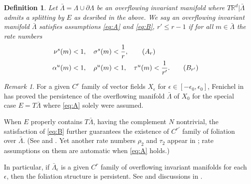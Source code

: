 \documentclass[usletter,11pt]{article}
\def\red{\color{red}}
\def\blue{\color{blue}}
\newtheorem{definition}{Definition}[section]
\theoremstyle{remark}
\newtheorem{remark}{Remark}[section]
\begin{document}
\begin{definition} \label{def:over}
Let $\bar{\Lambda}=\Lambda \cup \partial\Lambda$  be an overflowing invariant manifold {\blue where $T \mathbb{R}^d|\bar\Lambda$} admits a splitting by $E$ as desribed in the above. We say an overflowing invariant manifold $\bar{\Lambda}$ satisfies assumptions \eqref{eq:A} and \eqref{eq:B}, $r'\le r-1$ if for all $m\in \bar{\Lambda}$ the  rate numbers
\begin{align}
\nu^s(m)&<1, \quad \sigma^s(m)<\frac{1}{r}, \label{eq:A}\tag{$A_r$}   \\
\alpha^u(m)&<1, \quad \rho^u(m)<1, \quad \tau^u(m)<\frac{1}{r'}. \label{eq:B}\tag{$B_{r'}$}  
\end{align}
\end{definition}
\begin{remark}
For a given $C^r$ family of vector fields $X_\epsilon$ for $\epsilon\in[-\epsilon_0,\epsilon_0]$, Fenichel  in \cite{fenichel_persistence_1972} has proved the persistence of the overflowing manifold $\bar\Lambda$ of $X_0$ {\red for the special case $E=T\bar\Lambda$ where \eqref{eq:A} solely were assumed.}

{\blue When $E$ properly contains $T\bar\Lambda$, having the complement $N$ nontrivial, the satisfaction of \eqref{eq:B} further guarantees the existence of $C^{r'}$ family of foliation over $\bar\Lambda$. (See \cite[Theorem 4]{fenichel_asymptotic_1974} and \cite[Theorem 3]{fenichel_asymptotic_1977}. Yet another rate numbers $\rho_2$ and $\tau_2$ appear in \cite[pp. 84--85]{fenichel_asymptotic_1977}; rate assumptions on them are automatic when \eqref{eq:A} holds.)}

{\red In particular, if $\bar\Lambda_\epsilon$ is a given $C^r$ family of overflowing invariant manifolds for each $\epsilon$, 
then the foliation structure is persistent. See \cite[Theorem 9.1]{fenichel_geometric_1979} and discussions in \cite[p. 90]{fenichel_geometric_1979}. }

\end{remark}
\end{document}
